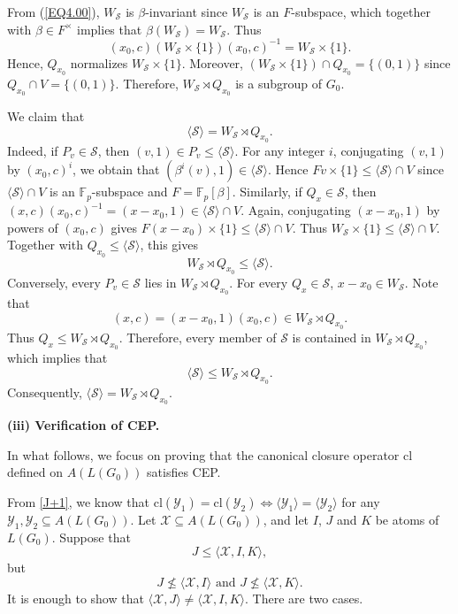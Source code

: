 \documentclass[12pt]{article}
\begin{document}
From (\ref{EQ4.00}), $W_{\mathcal{S}}$ is $\beta$-invariant 
since $W_{\mathcal{S}}$ is an $F$-subspace, which together 
with $\beta\in F^\times$ implies 
that $\beta(W_{\mathcal{S}})=W_{\mathcal{S}}$. Thus
$$(x_0,c)(W_{\mathcal{S}}\times\{1\})(x_0,c)^{-1}= W_{\mathcal{S}}\times\{1\}.$$
Hence, $Q_{x_0}$ normalizes $W_{\mathcal{S}}\times\{1\}$.
Moreover, $(W_{\mathcal{S}}\times\{1\})\cap Q_{x_0}
=\{(0,1)\}$ since $Q_{x_0}\cap V=\{(0,1)\}$. 
Therefore, $W_{\mathcal{S}}\rtimes Q_{x_0}$ is a subgroup of $G_0$.
 
We claim that 
\begin{equation}\label{EQ4.9}
\langle \mathcal{S} \rangle=W_{\mathcal{S}}\rtimes Q_{x_0}.    
\end{equation}
Indeed, if $P_v\in \mathcal{S}$, then $(v,1)\in P_v\leq \langle \mathcal{S} \rangle$. 
For any integer $i$, conjugating $(v,1)$ by $(x_0, c)^i$, we obtain that 
$(\beta^i(v),1)\in \langle \mathcal{S} \rangle$. Hence $Fv\times \{1\}\leq \langle \mathcal{S} \rangle\cap V$ since $\langle\mathcal{S}\rangle\cap V$ 
is an $\mathbb{F}_p$-subspace and $F=\mathbb{F}_p[\beta]$. Similarly, if $Q_x\in \mathcal{S}$, then 
$(x,c)(x_0,c)^{-1}=(x-x_0,1)\in  \langle \mathcal{S} \rangle\cap V.$
Again, conjugating $(x-x_0,1)$ by powers of $(x_0,c)$ gives 
$F(x-x_0)\times \{1\}\leq \langle \mathcal{S} \rangle\cap V$. 
Thus $W_{\mathcal{S}}\times \{1\} \leq \langle \mathcal{S} \rangle\cap V.$
Together with $Q_{x_0}\leq\langle\mathcal{S}\rangle$, this gives
$$W_{\mathcal{S}}\rtimes Q_{x_0}\leq\langle\mathcal{S}\rangle.$$
Conversely, every $P_v\in\mathcal{S}$ lies in $W_{\mathcal{S}}\rtimes Q_{x_0}$. 
For every $Q_x\in \mathcal{S}$, $x-x_0\in W_{\mathcal{S}}$. Note that 
$$(x,c)=(x-x_0,1)(x_0,c)\in W_{\mathcal{S}}\rtimes Q_{x_0}.$$
Thus $Q_x\leq W_{\mathcal{S}}\rtimes Q_{x_0}$.
Therefore, every member of $\mathcal{S}$ is contained in $W_{\mathcal{S}}\rtimes Q_{x_0}$, which implies that 
$$\langle\mathcal{S}\rangle\leq W_{\mathcal{S}}\rtimes Q_{x_0}.$$
Consequently, $\langle\mathcal{S}\rangle=W_{\mathcal{S}}\rtimes Q_{x_0}$.


\textbf{(iii) Verification of CEP.} 

In what follows, we focus on proving that the canonical closure operator $\mbox{cl}$ defined on $A(L(G_0))$ satisfies CEP.  

From \eqref{J+1}, we know that $\mbox{cl}(\mathcal{Y}_1)=\mbox{cl}(\mathcal{Y}_2)\Longleftrightarrow \langle \mathcal{Y}_1\rangle=\langle \mathcal{Y}_2\rangle$ 
for any $\mathcal{Y}_1, \mathcal{Y}_2 \subseteq A(L(G_0))$. 
Let $\mathcal{X}\subseteq A(L(G_0))$, and let $I$, $J$ and $K$ be atoms of $L(G_0)$. Suppose that  
\begin{equation}\label{eqqq13}
J\leq \langle \mathcal{X}, I, K\rangle,
\end{equation} 
but  
\begin{equation}\label{eqqq14} 
J\nleq \langle \mathcal{X}, I\rangle \mbox{ and } J\nleq \langle \mathcal{X}, K\rangle.
\end{equation}
It is enough to show that $\langle \mathcal{X}, J\rangle\neq\langle \mathcal{X}, I, K\rangle$.
There are two cases.
\end{document}
